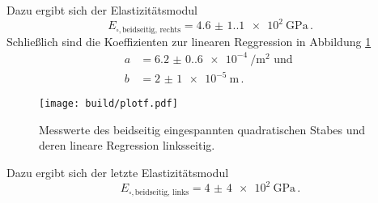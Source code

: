 Dazu ergibt sich der Elastizitätsmodul 
\begin{equation*}
    E_{\square,\text{beidseitig, rechts}}=\qty{4.6(1.1)e2}{\giga\pascal}\,.
\end{equation*}
Schließlich sind die Koeffizienten zur linearen Reggression in Abbildung \ref{fig:plotf} 
\begin{align*}
    a&=\qty{6.2(0.6)e-4}{\per\meter\squared} \text{ und }\\
    b&=\qty{2(1)e-5}{\meter}\,.
\end{align*}
\begin{figure}[H]
    \centering
    \caption{Messwerte des beidseitig eingespannten quadratischen Stabes und deren lineare Regression linksseitig.}
    \texttt{[image: build/plotf.pdf]}
    \label{fig:plotf}
\end{figure}
Dazu ergibt sich der letzte Elastizitätsmodul 
\begin{equation*}
    E_{\square,\text{beidseitig, links}}=\qty{4(4)e2}{\giga\pascal}\,.
\end{equation*}